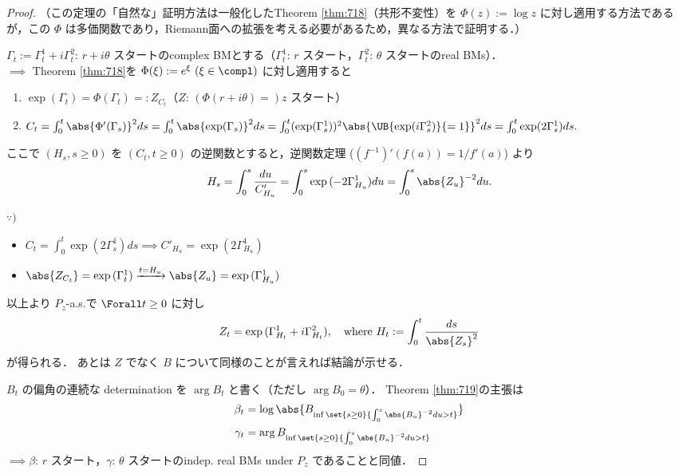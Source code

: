 \documentclass{jsarticle}
\begin{document}
\begin{proof}
    （この定理の「自然な」証明方法は一般化したTheorem \ref{thm:718}（共形不変性）を $\Phi(z):=\log z$ に対し適用する方法であるが，この $\Phi$ は多価関数であり，Riemann面への拡張を考える必要があるため，異なる方法で証明する．）

    $\Gamma_t:=\Gamma_t^1+i\Gamma_t^2$: $r+i\theta$ スタートのcomplex BMとする（$\Gamma_t^1$: $r$ スタート，$\Gamma_t^2$: $\theta$ スタートのreal BMs）．\\
    $\implies $ Theorem \ref{thm:718}を $\Phi(\xi):=e^{\xi}\ (\xi\in\compl)$ に対し適用すると
    \begin{enumerate}[label=(\roman*)]
        \item
        $\exp({\Gamma_t})=\Phi(\Gamma_t)=:Z_{C_t}$（$Z$: $(\Phi(r+i\theta)=)z$ スタート）
        \item
        $C_t=\int_0^t\abs{\Phi'(\Gamma_s)}^2ds=\int_0^t\abs{\exp({\Gamma_s})}^2ds=\int_0^t(\exp({\Gamma_s^1}))^2\abs{\UB{\exp({i\Gamma_s^2})}{=1}}^2ds=\int_0^t\exp({2\Gamma_s^1})ds.$
    \end{enumerate}

    ここで $(H_s, s\ge0)$ を $(C_t, t\ge0)$ の逆関数とすると，逆関数定理 ($(f^{-1})'(f(a))=1/f'(a)$) より
    \begin{align}
        H_s
        = \int_0^s\frac{du}{C'_{H_u}}
        = \int_0^s\exp{(-2\Gamma_{H_u}^1)}du
        = \int_0^s\abs{Z_u}^{-2}du.
    \end{align}

    \begin{screen}
        $\because)$
        \begin{itemize}
            \item 
            $C_t=\int_0^t\exp({2\Gamma_s^1})ds\implies C'_{H_u}=\exp({2\Gamma_{H_u}^1})$
            \item             $\abs{Z_{C_t}}=\exp{(\Gamma_t^1)}\xrightarrow{t=H_u}\abs{Z_u}=\exp{(\Gamma_{H_u}^1)}$
        \end{itemize}
    \end{screen}

    以上より $P_z$-a.s.で $\Forall t\ge0$ に対し
    $$
    Z_t=\exp{(\Gamma_{H_t}^1+i\Gamma_{H_t}^2)},\quad
    \text{where }H_t:=\int_0^t\frac{ds}{\abs{Z_s}^2}
    $$
    が得られる．
    あとは $Z$ でなく $B$ について同様のことが言えれば結論が示せる．

    $B_t$ の偏角の連続な determination を $\arg B_t$ と書く（ただし $\arg B_0=\theta$）．
    Theorem \ref{thm:719}の主張は
    \begin{align}
        \beta_t
        &= \log\abs{B_{\inf\set{s\ge0}{\int_0^s\abs{B_u}^{-2}du>t}}} \\
        \gamma_t
        &= \arg B_{\inf\set{s\ge0}{\int_0^s\abs{B_u}^{-2}du>t}}
    \end{align}
    $\implies \beta$: $r$ スタート，$\gamma$: $\theta$ スタートのindep. real BMs under $P_z$ であることと同値．


\end{proof}
\end{document}
